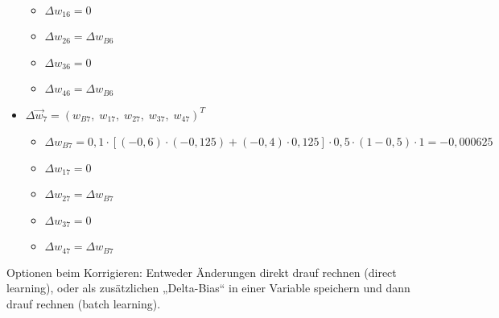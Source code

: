\begin{itemize}
\begin{itemize}
\item $\Delta w_{16} = 0$
\item $\Delta w_{26} = \Delta w_{B6}$
\item $\Delta w_{36} = 0$
\item $\Delta w_{46} = \Delta w_{B6}$
\end{itemize}
\item $\Delta \vec{w}_7 = (w_{B7},\; w_{17},\; w_{27},\; w_{37},\; w_{47})^T$
\begin{itemize}
\item $\Delta w_{B7} = 0,1 \cdot [(-0,6) \cdot (-0,125) + (-0,4) \cdot 0,125]\cdot 0,5 \cdot (1-0,5) \cdot 1 = -0,000625$
\item $\Delta w_{17} = 0$
\item $\Delta w_{27} = \Delta w_{B7}$
\item $\Delta w_{37} = 0$
\item $\Delta w_{47} = \Delta w_{B7}$
\end{itemize}
\end{itemize}
Optionen beim Korrigieren: Entweder Änderungen direkt drauf rechnen (direct learning), oder als zusätzlichen „Delta-Bias“ in einer Variable speichern und dann drauf rechnen (batch learning).


